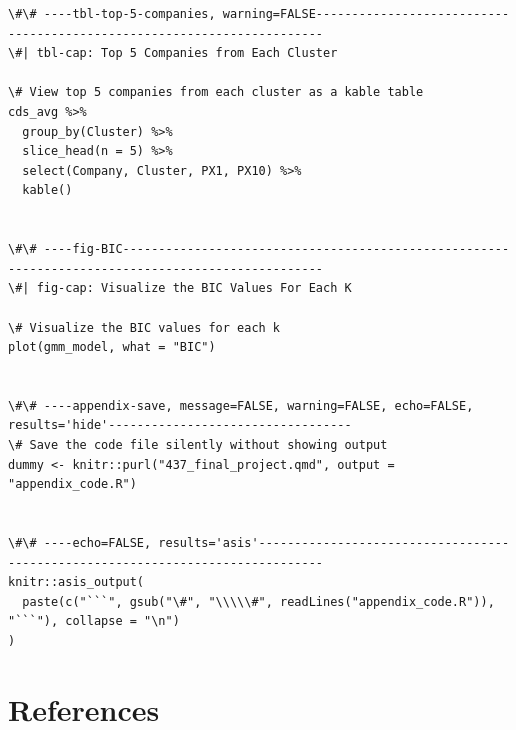 \documentclass[
  letterpaper,
  DIV=11,
  numbers=noendperiod]{scrartcl}
\begin{document}
\begin{verbatim}
\#\# ----tbl-top-5-companies, warning=FALSE-----------------------------------------------------------------------
\#| tbl-cap: Top 5 Companies from Each Cluster

\# View top 5 companies from each cluster as a kable table
cds_avg %>%
  group_by(Cluster) %>%
  slice_head(n = 5) %>%
  select(Company, Cluster, PX1, PX10) %>%
  kable()


\#\# ----fig-BIC--------------------------------------------------------------------------------------------------
\#| fig-cap: Visualize the BIC Values For Each K

\# Visualize the BIC values for each k
plot(gmm_model, what = "BIC")


\#\# ----appendix-save, message=FALSE, warning=FALSE, echo=FALSE, results='hide'----------------------------------
\# Save the code file silently without showing output
dummy <- knitr::purl("437_final_project.qmd", output = "appendix_code.R")


\#\# ----echo=FALSE, results='asis'-------------------------------------------------------------------------------
knitr::asis_output(
  paste(c("```", gsub("\#", "\\\\\#", readLines("appendix_code.R")), "```"), collapse = "\n")
)
\end{verbatim}

\newpage

\hypertarget{references}{%
\section*{References}\label{references}}
\end{document}
